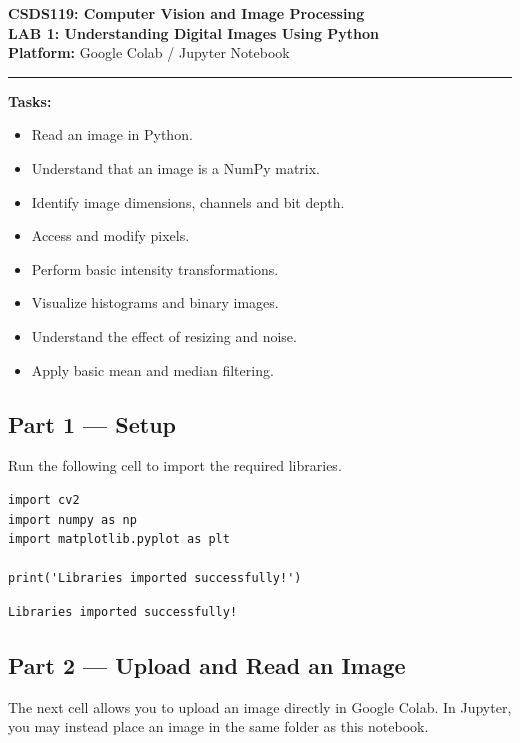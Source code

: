 \documentclass[12pt]{article}
\begin{document}
\begin{center}
    {\Large \textbf{CSDS119: Computer Vision and Image Processing}}\\[4pt]
    {\large \textbf{LAB 1: Understanding Digital Images Using Python}}\\[3pt]
    \textbf{Platform:} Google Colab / Jupyter Notebook
\end{center}

\vspace{-4pt}
\hrule
\vspace{6pt}

\textbf{Tasks:}
\begin{itemize}
    \setlength\itemsep{0pt}
    \item Read an image in Python.
    \item Understand that an image is a NumPy matrix.
    \item Identify image dimensions, channels and bit depth.
    \item Access and modify pixels.
    \item Perform basic intensity transformations.
    \item Visualize histograms and binary images.
    \item Understand the effect of resizing and noise.
    \item Apply basic mean and median filtering.
\end{itemize}

\subsection*{Part 1 — Setup}
Run the following cell to import the required libraries.

\begin{lstlisting}[style=code]
import cv2
import numpy as np
import matplotlib.pyplot as plt

print('Libraries imported successfully!')
\end{lstlisting}

\begin{lstlisting}[style=output]
Libraries imported successfully!
\end{lstlisting}

\subsection*{Part 2 — Upload and Read an Image}
The next cell allows you to upload an image directly in Google Colab. In Jupyter, you may instead place an image in the same folder as this notebook.
\end{document}
